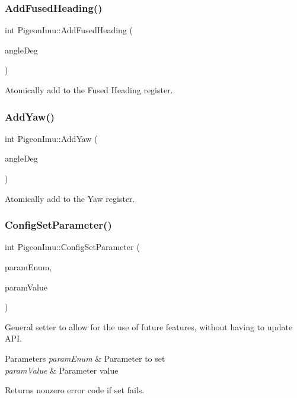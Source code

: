 \subsubsection{\texorpdfstring{Add\+Fused\+Heading()}{AddFusedHeading()}}
{\footnotesize\ttfamily int Pigeon\+Imu\+::\+Add\+Fused\+Heading (\begin{DoxyParamCaption}\item[{double}]{angle\+Deg }\end{DoxyParamCaption})}

Atomically add to the Fused Heading register. \mbox{\label{class_pigeon_imu_af2a22a05165f430d3ab312ac5691cb86}} 
\subsubsection{\texorpdfstring{Add\+Yaw()}{AddYaw()}}
{\footnotesize\ttfamily int Pigeon\+Imu\+::\+Add\+Yaw (\begin{DoxyParamCaption}\item[{double}]{angle\+Deg }\end{DoxyParamCaption})}

Atomically add to the Yaw register. \mbox{\label{class_pigeon_imu_a8a7869d0848c65ab241f2592771c4341}} 
\subsubsection{\texorpdfstring{Config\+Set\+Parameter()}{ConfigSetParameter()}}
{\footnotesize\ttfamily int Pigeon\+Imu\+::\+Config\+Set\+Parameter (\begin{DoxyParamCaption}\item[{\hyperlink{class_pigeon_imu_a9c6cc7a5797d5fce467e31040e1dbb2a}{Param\+Enum}}]{param\+Enum,  }\item[{double}]{param\+Value }\end{DoxyParamCaption})}

General setter to allow for the use of future features, without having to update A\+PI. 
\begin{DoxyParams}{Parameters}
{\em param\+Enum} & Parameter to set \\
\hline
{\em param\+Value} & Parameter value \\
\hline
\end{DoxyParams}
\begin{DoxyReturn}{Returns}
nonzero error code if set fails. 
\end{DoxyReturn}
\mbox{\label{class_pigeon_imu_a5454ebd8ff7820e18119422749f1401a}} 
